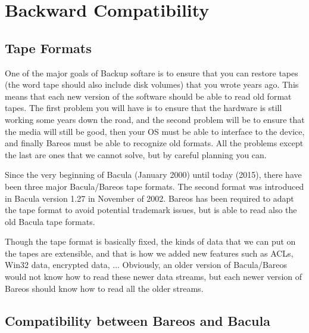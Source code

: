 \chapter{Backward Compatibility}
\label{backward-compability}

\section{Tape Formats}
\label{backward-compability-tape-format}


One of the major goals of Backup softare is to ensure that you can restore
tapes (the word tape should also include disk volumes) that you wrote years
ago.  This means that each new version of the software should be able to read old
format tapes. The first problem you will have is to ensure that the
hardware is still working some years down the road, and the second
problem will be to ensure that the media will still be good, then
your OS must be able to interface to the device, and finally Bareos
must be able to recognize old formats.  All the problems except the
last are ones that we cannot solve, but by careful planning you can.

Since the very beginning of Bacula (January 2000) until today (2015),
there have been three major Bacula/Bareos tape formats.  The second format
was introduced in Bacula version 1.27 in November of 2002.
Bareos has been required to adapt the tape format to avoid potential trademark issues,
but is able to read also the old Bacula tape formats.

Though the tape format is basically fixed, the kinds of data that we can put on the
tapes are extensible, and that is how we added new features
such as ACLs, Win32 data, encrypted data, ...  Obviously, an older
version of Bacula/Bareos would not know how to read these newer data streams,
but each newer version of Bareos should know how to read all the
older streams.

%
%
%

\section{Compatibility between Bareos and Bacula}
\label{compat-bacula}

